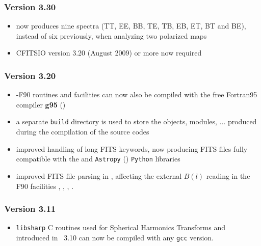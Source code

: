 \documentclass[12pt,twoside]{article}
\newcommand{\compresslist}{%
\setlength{\itemsep}{0ex}}{}
\begin{document}
{%
\subsubsection{Version 3.30}
\begin{itemize}\compresslist
	\item {} now produces nine spectra 
	(TT, EE, BB, TE, TB, EB, ET, BT and BE), instead of six previously,
          when analyzing two polarized maps
	\item CFITSIO version 3.20 (August 2009) or more now required
\end{itemize}



\subsubsection{Version 3.20}
\begin{itemize}\compresslist
	\item \healpixns-F90 routines and facilities can now also be compiled with
the free Fortran95 compiler \textbf{g95} ()
 	\item a separate {\tt build} directory is used to store the objects,
modules, ... produced during the compilation of the source codes
	\item improved handling of long FITS keywords, now producing FITS files
fully compatible with the
and 
{\tt Astropy} ()
{\tt Python} libraries
	\item improved FITS file parsing in 
,
affecting the external $B(l)$ reading in the F90 facilities 
, 
, 
, 
.
\end{itemize}

\subsubsection{Version 3.11}
\begin{itemize}\compresslist
	\item {\tt libsharp} C routines used for Spherical Harmonics Transforms 
and introduced in \healpix\ 3.10
can now be compiled with any {\tt gcc} version.
\end{itemize}

}
\end{document}
